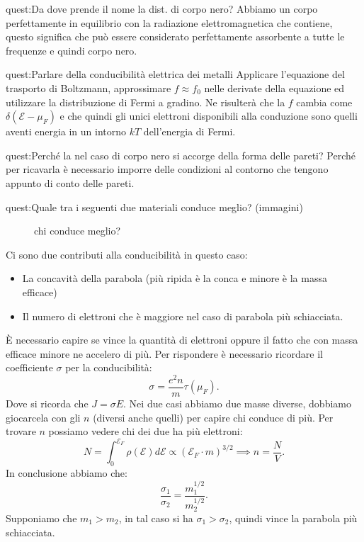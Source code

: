 \begin{quest}{quest:Da dove prende il nome la dist. di corpo nero?}
    Abbiamo un corpo perfettamente in equilibrio con la radiazione elettromagnetica che contiene, questo significa che può essere considerato perfettamente assorbente a tutte le frequenze e quindi corpo nero. 
\end{quest}
\begin{quest}{quest:Parlare della conducibilità elettrica dei metalli}
    Applicare l'equazione del trasporto di Boltzmann, approssimare $f\approx f_0$ nelle derivate della equazione ed utilizzare la distribuzione di Fermi a gradino. Ne risulterà che la $f$ cambia come $\delta (\mathcal{E}-\mu_F)$ e che quindi gli unici elettroni disponibili alla conduzione sono quelli aventi energia in un intorno $kT$ dell'energia di Fermi.
\end{quest}
\begin{quest}{quest:Perché la  nel caso di corpo nero si accorge della forma delle pareti?}
Perché per ricavarla è necessario imporre delle condizioni al contorno che tengono appunto di conto delle pareti. 
\end{quest}

\begin{quest}{quest:Quale tra i seguenti due materiali conduce meglio? (immagini) }
\begin{figure}[H]
    \centering
    \caption{chi conduce meglio?}
    \label{fig:chi-conduce-meglio?}
\end{figure}
Ci sono due contributi alla conducibilità in questo caso: 
\begin{itemize}
    \item La concavità della parabola (più ripida è la conca e minore è la massa efficace)
    \item Il numero di elettroni che è maggiore nel caso di parabola più schiacciata.
\end{itemize}
È necessario capire se vince la quantità di elettroni oppure il fatto che con massa efficace minore ne accelero di più. 
Per rispondere è necessario ricordare il coefficiente $\sigma$ per la conducibilità:
\[
    \sigma  = \frac{e^2n}{m}\tau (\mu_F) 
.\] 
Dove si ricorda che $J = \sigma E$. Nei due casi abbiamo due masse diverse, dobbiamo giocarcela con gli $n$ (diversi anche quelli) per capire chi conduce di più.
Per trovare $n$ possiamo vedere chi dei due ha più elettroni: 
\[
    N = \int_{0}^{\mathcal{E}_F} \rho (\mathcal{E}) d\mathcal{E}\propto\left(\mathcal{E}_F\cdot m\right)^{3 /2} \implies  n = \frac{N}{V}
.\] 
In conclusione abbiamo che:
\[
    \frac{\sigma_1}{\sigma_2} = \frac{m_1^{1 /2}}{m_2^{1 /2}}
.\] 
Supponiamo che $m_1>m_2$, in tal caso si ha $\sigma_1>\sigma_2$, quindi vince la parabola più schiacciata.	
\end{quest}

